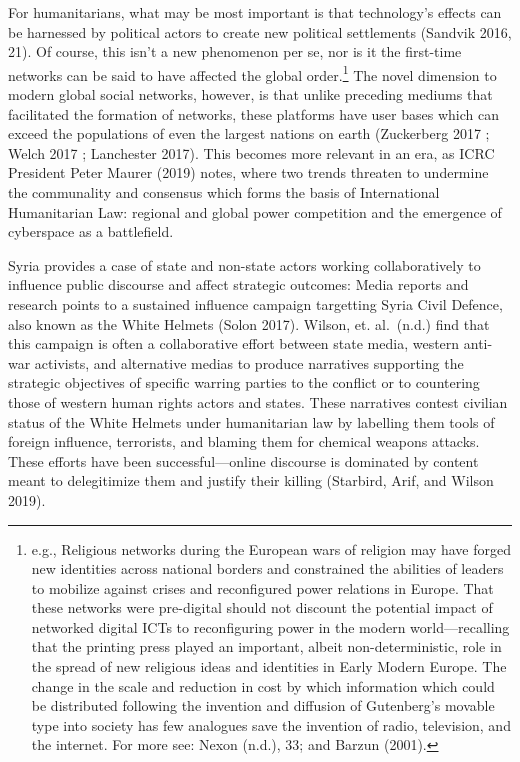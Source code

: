 For humanitarians, what may be most important is that technology's
effects can be harnessed by political actors to create new political
settlements (Sandvik 2016, 21). Of course, this isn't a new phenomenon
per se, nor is it the first-time networks can be said to have affected
the global order.\footnote{e.g., Religious networks during the European
  wars of religion may have forged new identities across national
  borders and constrained the abilities of leaders to mobilize against
  crises and reconfigured power relations in Europe. That these networks
  were pre-digital should not discount the potential impact of networked
  digital ICTs to reconfiguring power in the modern world---recalling
  that the printing press played an important, albeit non-deterministic,
  role in the spread of new religious ideas and identities in Early
  Modern Europe. The change in the scale and reduction in cost by which
  information which could be distributed following the invention and
  diffusion of Gutenberg's movable type into society has few analogues
  save the invention of radio, television, and the internet. For more
  see: Nexon (n.d.), 33; and Barzun (2001).} The novel dimension to
modern global social networks, however, is that unlike preceding mediums
that facilitated the formation of networks, these platforms have user
bases which can exceed the populations of even the largest nations on
earth (Zuckerberg 2017 ; Welch 2017 ; Lanchester 2017). This becomes
more relevant in an era, as ICRC President Peter Maurer (2019) notes,
where two trends threaten to undermine the communality and consensus
which forms the basis of International Humanitarian Law: regional and
global power competition and the emergence of cyberspace as a
battlefield.

Syria provides a case of state and non-state actors working
collaboratively to influence public discourse and affect strategic
outcomes: Media reports and research points to a sustained influence
campaign targetting Syria Civil Defence, also known as the White Helmets
(Solon 2017). Wilson, et. al.~(n.d.) find that this campaign is often a
collaborative effort between state media, western anti-war activists,
and alternative medias to produce narratives supporting the strategic
objectives of specific warring parties to the conflict or to countering
those of western human rights actors and states. These narratives
contest civilian status of the White Helmets under humanitarian law by
labelling them tools of foreign influence, terrorists, and blaming them
for chemical weapons attacks. These efforts have been
successful---online discourse is dominated by content meant to
delegitimize them and justify their killing (Starbird, Arif, and Wilson
2019).

